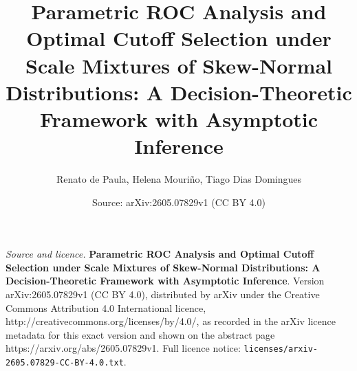 \documentclass[10pt,a4paper]{amsart}
\title{\textbf{Parametric ROC Analysis and Optimal Cutoff Selection under Scale Mixtures of Skew-Normal Distributions: A Decision-Theoretic Framework with Asymptotic Inference}}
\author{Renato de Paula, Helena Mouri\~no, Tiago Dias Domingues}
\date{Source: arXiv:2605.07829v1 (CC BY 4.0)}
\begin{document}
\maketitle

\noindent\emph{Source and licence.} \textbf{Parametric ROC Analysis and Optimal Cutoff Selection under Scale Mixtures of Skew-Normal Distributions: A Decision-Theoretic Framework with Asymptotic Inference}. Version arXiv:2605.07829v1 (CC BY 4.0), distributed by arXiv under the Creative Commons Attribution 4.0 International licence, http://creativecommons.org/licenses/by/4.0/, as recorded in the arXiv licence metadata for this exact version and shown on the abstract page https://arxiv.org/abs/2605.07829v1. Full licence notice: \texttt{licenses/arxiv-2605.07829-CC-BY-4.0.txt}.\par\smallskip
\end{document}
